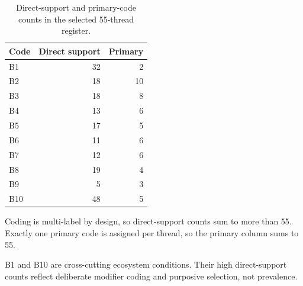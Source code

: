 \begin{table}[t]
\centering
\caption{Direct-support and primary-code counts in the selected 55-thread register.}
\label{tab:code-counts}
\begin{threeparttable}
\begin{tabular}{@{}lrr@{}}
\toprule
Code & Direct support & Primary \\
\midrule
B1 & 32 & 2 \\
B2 & 18 & 10 \\
B3 & 18 & 8 \\
B4 & 13 & 6 \\
B5 & 17 & 5 \\
B6 & 11 & 6 \\
B7 & 12 & 6 \\
B8 & 19 & 4 \\
B9 & 5 & 3 \\
B10 & 48 & 5 \\
\bottomrule
\end{tabular}
\begin{tablenotes}[flushleft]\footnotesize
\item Coding is multi-label by design, so direct-support counts sum to more than 55. Exactly one primary code is assigned per thread, so the primary column sums to 55.
\item B1 and B10 are cross-cutting ecosystem conditions. Their high direct-support counts reflect deliberate modifier coding and purposive selection, not prevalence.
\end{tablenotes}
\end{threeparttable}
\end{table}
